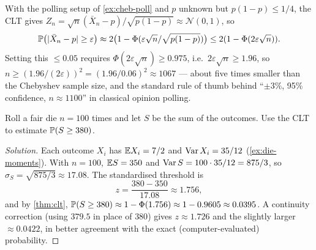 \begin{example}
\label{ex:clt-poll}
With the polling setup of \cref{ex:cheb-poll} and $p$ unknown but
$p(1-p) \leq 1/4$, the CLT gives
$Z_n = \sqrt n (\bar X_n - p)/\sqrt{p(1-p)} \approx \mathcal{N}(0,1)$,
so
\[
  \mathbb{P}\bigl(|\bar X_n - p| \geq \varepsilon\bigr) \approx 2\bigl(1 - \Phi(\varepsilon \sqrt n / \sqrt{p(1-p)})\bigr) \leq 2(1 - \Phi(2 \varepsilon \sqrt n)).
\]
Setting this $\leq 0.05$ requires $\Phi(2 \varepsilon \sqrt n) \geq 0.975$,
i.e.\ $2 \varepsilon \sqrt n \geq 1.96$, so $n \geq (1.96/(2 \varepsilon))^2 = (1.96/0.06)^2 \approx 1067$ —
about five times smaller than the Chebyshev sample size, and the
standard rule of thumb behind ``$\pm 3\%$, 95\% confidence, $n \approx 1100$''
in classical opinion polling.
\end{example}

\begin{problem}
\label{prob:dice-clt}
Roll a fair die $n = 100$ times and let $S$ be the sum of the
outcomes. Use the CLT to estimate $\mathbb{P}(S \geq 380)$.
\end{problem}

\begin{proof}[Solution]
Each outcome $X_i$ has $\mathbb{E} X_i = 7/2$ and $\operatorname{Var} X_i = 35/12$
(\cref{ex:die-moments}). With $n = 100$, $\mathbb{E} S = 350$ and
$\operatorname{Var} S = 100 \cdot 35/12 = 875/3$, so $\sigma_S = \sqrt{875/3} \approx 17.08$.
The standardised threshold is
\[
  z = \frac{380 - 350}{17.08} \approx 1.756,
\]
and by \cref{thm:clt}, $\mathbb{P}(S \geq 380) \approx 1 - \Phi(1.756) \approx 1 - 0.9605 \approx 0.0395$.
A continuity correction (using $379.5$ in place of $380$) gives
$z \approx 1.726$ and the slightly larger $\approx 0.0422$, in
better agreement with the exact (computer-evaluated) probability.
\end{proof}
